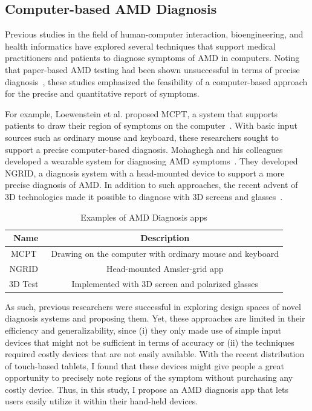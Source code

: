 \subsection{Computer-based AMD Diagnosis}

Previous studies in the field of human-computer interaction, bioengineering, and health informatics have explored several techniques that support medical practitioners and patients to diagnose symptoms of AMD in computers. Noting that paper-based AMD testing had been shown unsuccessful in terms of precise diagnosis~\cite{fine1986earliest, roy1985vision}, these studies emphasized the feasibility of a computer-based approach for the precise and quantitative report of symptoms.

For example, Loewenstein et al. proposed MCPT, a system that supports patients to draw their region of symptoms on the computer~\cite{loewenstein2003replacing}. With basic input sources such as ordinary mouse and keyboard, these researchers sought to support a precise computer-based diagnosis. Mohaghegh and his colleagues developed a wearable system for diagnosing AMD symptoms~\cite{mohaghegh2016wearable}. They developed NGRID, a diagnosis system with a head-mounted device to support a more precise diagnosis of AMD. In addition to such approaches, the recent advent of 3D technologies made it possible to diagnose with 3D screens and glasses~\cite{kim2020novel}.

\begin{table}[htbp]
	\begin{center}
	\caption{Examples of AMD Diagnosis apps}
	\vspace{0.2cm}
	\begin{tabular}{|c|c|} \hline
		\textbf{Name} & \textbf{Description}\\ \hline
		\hline {\sc MCPT~\cite{loewenstein2003replacing}} & Drawing on the computer with ordinary mouse and keyboard\\
		\hline {\sc NGRID~\cite{mohaghegh2016wearable}} & Head-mounted Amsler-grid app\\
		\hline {\sc 3D Test~\cite{kim2020novel}} & Implemented with 3D screen and polarized glasses\\
		\hline
	\end{tabular}
	\label{tab1}
	\end{center}
\end{table}

As such, previous researchers were successful in exploring design spaces of novel diagnosis systems and proposing them. Yet, these approaches are limited in their efficiency and generalizability, since (i) they only made use of simple input devices that might not be sufficient in terms of accuracy or (ii) the techniques required costly devices that are not easily available. With the recent distribution of touch-based tablets, I found that these devices might give people a great opportunity to precisely note regions of the symptom without purchasing any costly device. Thus, in this study, I propose an AMD diagnosis app that lets users easily utilize it within their hand-held devices.